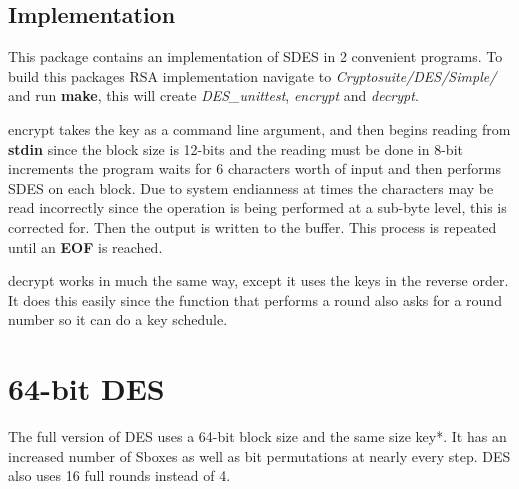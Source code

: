 \subsection{Implementation}

This package contains an implementation of SDES in 2 convenient programs.
To build this packages RSA implementation navigate to \textit{Cryptosuite/DES/Simple/} and run \textbf{make}, this will create \textit{DES\_unittest}, \textit{ encrypt} and \textit{decrypt}.

encrypt takes the key as a command line argument, and then begins reading from \textbf{stdin} since the block size is 12-bits and the reading must be done in 8-bit increments the program waits for 6 characters worth of input and then performs SDES on each block.
Due to system endianness at times the characters may be read incorrectly since the operation is being performed at a sub-byte level, this is corrected for.
Then the output is written to the buffer. This process is repeated until an \textbf{EOF} is reached.

decrypt works in much the same way, except it uses the keys in the reverse order. It does this easily since the function that performs a round also asks for a round number so it can do a key schedule.


\section{64-bit DES}

The full version of DES uses a 64-bit block size and the same size key*.
It has an increased number of Sboxes as well as bit permutations at nearly every step.
DES also uses 16 full rounds instead of 4.

